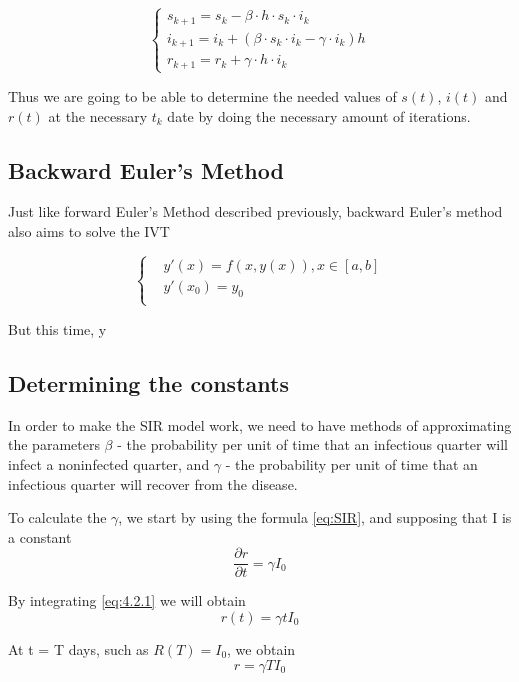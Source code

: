 \[
	\left\{
		\begin{array}{l}
			s_{k+1}=s_k - \beta \cdot h \cdot s_k \cdot i_k \\
			i_{k+1}=i_k + (\beta \cdot s_k \cdot i_k - \gamma \cdot i_k)h \\
			r_{k+1}=r_k+ \gamma \cdot h \cdot i_k
		\end{array}
	\right.
\]
\par
\par Thus we are going to be able to determine the needed values of $s(t)$, $i(t)$ and $r(t)$
at the necessary $t_k$ date by doing the necessary amount of iterations.

\subsection{Backward Euler's Method}
\par Just like forward Euler's Method described previously, backward Euler's method also aims to solve
the IVT

\begin{equation}
	\left\{\begin{aligned}
		& y'(x) = f(x,y(x)), x \in [a,b] \\
		& y'(x_0)=y_0 \\
	\end{aligned}
\end{equation}

\par But this time, y


\subsection{Determining the constants}
\hspace{\parindent}In order to make the SIR model work, we need to have methods of approximating the parameters $\beta$ - the probability
per unit of time that an infectious quarter will infect a noninfected quarter, and $\gamma$ - the probability
per unit of time that an infectious quarter will recover from the disease.
\par
\par To calculate the $\gamma$, we start by using the formula \ref{eq:SIR}, and supposing that I is a constant
\begin{equation}
	\frac{\partial r}{\partial t} = \gamma I_0 \label{eq:4.2.1}
\end{equation}
\par By integrating \ref{eq:4.2.1} we will obtain
\begin{equation}
	r(t) = \gamma t I_0 \label{eq:4.2.2}
\end{equation}
\par At t = T days, such as $R(T)=I_0$, we obtain
\begin{equation}
	r = \gamma T I_0 \label{eq:4.2.3}
\end{equation}

